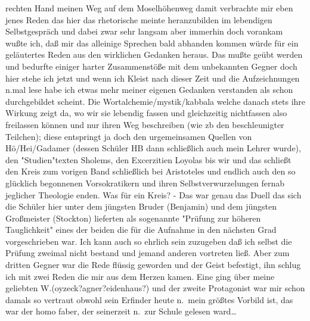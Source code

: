 \documentclass[
]{article}
\begin{document}
rechten Hand meinen Weg auf dem Moselhöhenweg damit verbrachte mir eben
jenes Reden das hier das rhetorische meinte heranzubilden im lebendigen
Selbstgespräch und dabei zwar sehr langsam aber immerhin doch vorankam
wußte ich, daß mir das alleinige Sprechen bald abhanden kommen würde für
ein geläutertes Reden aus den wirklichen Gedanken heraus. Das mußte
geübt werden und bedurfte einiger harter Zusammenstöße mit dem
unbekannten Gegner doch hier stehe ich jetzt und wenn ich Kleist nach
dieser Zeit und die Aufzeichnungen n.mal lese habe ich etwas mehr meiner
eigenen Gedanken verstanden als schon durchgebildet scheint. Die
Wortalchemie/mystik/kabbala welche danach stets ihre Wirkung zeigt da,
wo wir sie lebendig fassen und gleichzeitig nichtfassen also freilassen
können und nur ihren Weg beschreiben (wie zb den beschleunigter
Teilchen); diese entspringt ja doch den urgemeinsamen Quellen von
Hö/Hei/Gadamer (dessen Schüler HB dann schließlich auch mein Lehrer
wurde), den "Studien"texten Sholems, den Excerzitien Loyolas bis wir und
das schließt den Kreis zum vorigen Band schließlich bei Aristoteles und
endlich auch den so glücklich begonnenen Vorsokratikern und ihren
Selbstverwurzelungen fernab jeglicher Theologie enden. Was für ein
Kreis? - Das war genau das Duell das sich die Schüler hier unter dem
jüngsten Bruder (Benjamin) und dem jüngsten Großmeister (Stockton)
lieferten als sogenannte "Prüfung zur höheren Tauglichkeit" eines der
beiden die für die Aufnahme in den nächsten Grad vorgeschrieben war. Ich
kann auch so ehrlich sein zuzugeben daß ich selbst die Prüfung zweimal
nicht bestand und jemand anderen vortreten ließ. Aber zum dritten Gegner
war die Rede flüssig geworden und der Geist befestigt, ihn schlug ich
mit zwei Reden die mir aus dem Herzen kamen. Eine ging über meine
geliebten W.(oyzeck?agner?eidenhaus?) und der zweite Protagonist war mir
schon damals so vertraut obwohl sein Erfinder heute n.~mein größtes
Vorbild ist, das war der homo faber, der seinerzeit n.~zur Schule
gelesen ward\ldots{}
\end{document}
